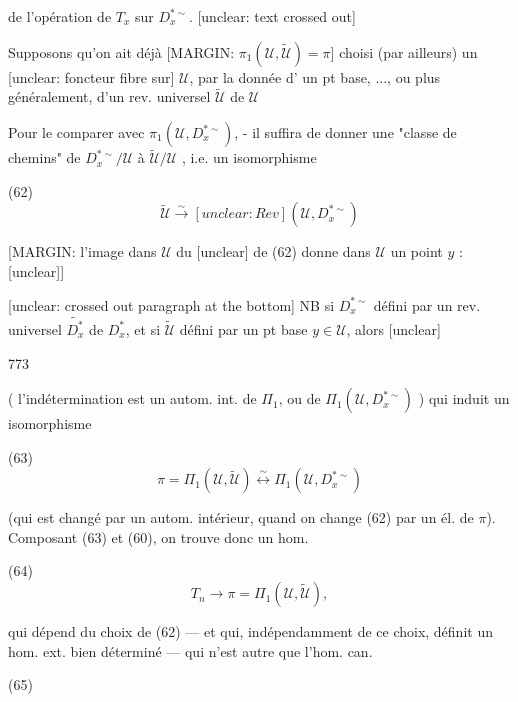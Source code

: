
de l'opération de $T_x$ sur
$D_x^{*\sim}$. [unclear: text crossed out]

Supposons qu'on ait déjà
[MARGIN: $\pi_1(\mathcal{U},\tilde{\mathcal{U}}) = \pi$]
choisi (par ailleurs) un [unclear: foncteur fibre sur] $\mathcal{U}$,
par la donnée d' un pt base, ..., ou plus
généralement, d'un rev. universel $\tilde{\mathcal{U}}$ de $\mathcal{U}$

Pour le comparer avec $\pi_1(\mathcal{U}, D_x^{*\sim})$,
- il suffira de donner une "classe de chemins"
de $D_x^{*\sim} / \mathcal{U}$ à $\tilde{\mathcal{U}} / \mathcal{U}$ , i.e. un
isomorphisme

(62) $$ \tilde{\mathcal{U}} \xrightarrow{\sim} [unclear: Rev](\mathcal{U}, D_x^{*\sim}) $$

[MARGIN: l'image dans $\mathcal{U}$ du [unclear] de (62) donne dans $\mathcal{U}$ un point $y$ : [unclear]]

[unclear: crossed out paragraph at the bottom]
NB si $D_x^{*\sim}$ défini
par un rev. universel $\widetilde{D_x^*}$
de $D_x^*$, et si $\tilde{\mathcal{U}}$
défini par un pt base $y \in \mathcal{U}$,
alors [unclear]

\newpage


773

( l'indétermination est un autom.
int. de $\Pi_1$, ou de $\Pi_1(\mathcal{U}, D_x^{* \sim})$ ) qui
induit un isomorphisme

(63) $$ \pi = \Pi_1(\mathcal{U}, \tilde{\mathcal{U}}) \overset{\sim}{\longleftrightarrow} \Pi_1(\mathcal{U}, D_x^{* \sim}) $$

(qui est changé par un autom. intérieur,
quand on change (62) par un él. de $\pi$).
Composant (63) et (60), on trouve donc
un hom.

(64) $$ T_n \longrightarrow \pi = \Pi_1(\mathcal{U}, \tilde{\mathcal{U}}) , $$

qui dépend du choix de (62) — et
qui, indépendamment de ce choix, définit
un hom. ext. bien déterminé —
qui n'est autre que l'hom. can.

(65) 

